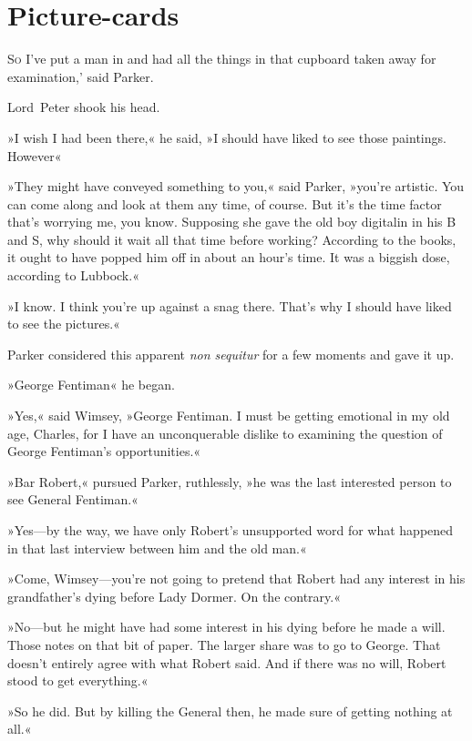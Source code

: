 \chapter{Picture-cards}

\lettrine[lines=4,ante=‘]{S}{o} I've put a man in and had all the things in that cupboard taken away for examination,' said Parker.

\zz
Lord~Peter shook his head.

\zz
»I wish I had been there,« he said, »I should have liked to see those paintings. However\longdash«

»They might have conveyed something to you,« said Parker, »you're artistic. You can come along and look at them any time, of course. But it's the time factor that's worrying me, you know. Supposing she gave the old boy digitalin in his B and S, why should it wait all that time before working? According to the books, it ought to have popped him off in about an hour's time. It was a biggish dose, according to Lubbock.«

»I know. I think you're up against a snag there. That's why I should have liked to see the pictures.«

Parker considered this apparent \textit{non sequitur} for a few moments and gave it up.

»George Fentiman\longdash« he began.

»Yes,« said Wimsey, »George Fentiman. I must be getting emotional in my old age, Charles, for I have an unconquerable dislike to examining the question of George Fentiman's opportunities.«

»Bar Robert,« pursued Parker, ruthlessly, »he was the last interested person to see General Fentiman.«

»Yes—by the way, we have only Robert's unsupported word for what happened in that last interview between him and the old man.«

»Come, Wimsey—you're not going to pretend that Robert had any interest in his grandfather's dying before Lady Dormer. On the contrary.«

»No—but he might have had some interest in his dying before he made a will. Those notes on that bit of paper. The larger share was to go to George. That doesn't entirely agree with what Robert said. And if there was no will, Robert stood to get everything.«

»So he did. But by killing the General then, he made sure of getting nothing at all.«

